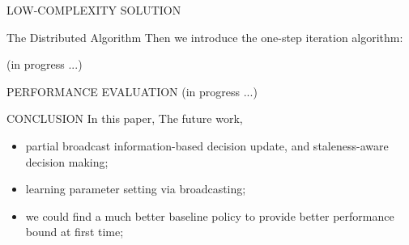\documentclass[10pt, conference, letterpaper]{IEEEtran}
\renewcommand{\vec}{\mathbf}
\begin{document}
\begin{section}{LOW-COMPLEXITY SOLUTION}
\begin{subsection}{The Distributed Algorithm}
            Then we introduce the one-step iteration algorithm:
            \begin{algorithm}[H]
                \caption{Distributed Algorithm for $k$-th AP}
                \begin{algorithmic}
                    \WHILE{\TRUE}
                        \STATE (in progress ...)
                    \ENDWHILE
                \end{algorithmic}
            \end{algorithm}
        \end{subsection}
        
    \end{section}

    \begin{section}{PERFORMANCE EVALUATION}
        \label{sec:evaluation}
        (in progress ...)
    \end{section}

    \begin{section}{CONCLUSION}
        \label{sec:conclusion}
        In this paper,
        The future work,
        \begin{itemize}
            \item partial broadcast information-based decision update, and staleness-aware decision making;
            \item learning parameter setting via broadcasting;
            \item we could find a much better baseline policy to provide better performance bound at first time;
        \end{itemize}
    \end{section}
    
    \appendices
\end{document}
